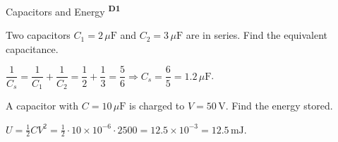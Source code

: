 ﻿\documentclass[12pt,a4paper]{article}
\providecommand{\KPProblems}{}
\newcommand{\DOne}{\texorpdfstring{\textsuperscript{\textbf{D1}}}{ D1}}
\begin{document}
\begin{KnowledgePoint}{Capacitors and Energy \DOne}
  \KPProblems
\begin{cheatproblem}
  Two capacitors $C_1=2\,\mu\text{F}$ and $C_2=3\,\mu\text{F}$ are in series. Find the equivalent capacitance.
\begin{solutionbox}
  $\dfrac{1}{C_s}=\dfrac{1}{C_1}+\dfrac{1}{C_2}=\dfrac{1}{2}+\dfrac{1}{3}=\dfrac{5}{6}\Rightarrow C_s=\dfrac{6}{5}=1.2\,\mu\text{F}$.
\end{solutionbox}
\end{cheatproblem}
\begin{cheatproblem}
  A capacitor with $C=10\,\mu\text{F}$ is charged to $V=50\,\text{V}$. Find the energy stored.
\begin{solutionbox}
  $U=\tfrac12 CV^2=\tfrac12\cdot10\times10^{-6}\cdot2500=12.5\times10^{-3}=12.5\,\text{mJ}$.
\end{solutionbox}
\end{cheatproblem}
\end{KnowledgePoint}
\end{document}
